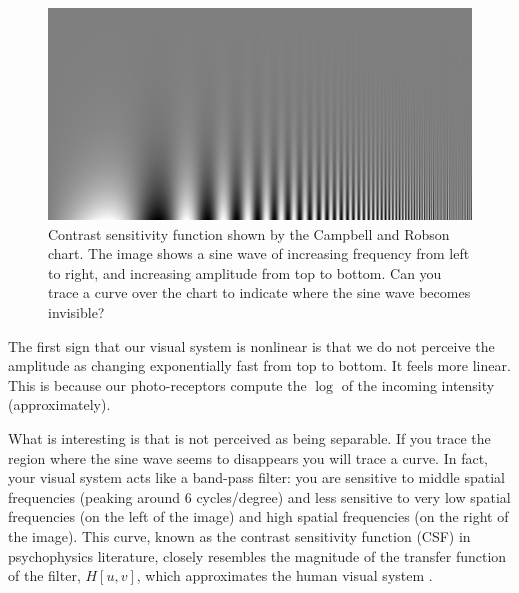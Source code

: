 \begin{figure}[t]
	\centerline{
		\includegraphics[width=1\linewidth]{figures/spatial_filters/csf.jpg}
	}
	\caption{Contrast sensitivity function shown by the Campbell and Robson chart. The image shows a sine wave of increasing frequency from left to right, and increasing amplitude from top to bottom. Can you trace a curve over the chart to indicate where the sine wave becomes invisible?}
	\label{fig:csfchart}
\end{figure}


The first sign that our visual system is nonlinear is that we do not perceive the amplitude as changing exponentially fast from top to bottom. It feels more linear. This is because our photo-receptors compute the $\log$ of the incoming intensity (approximately).

What is interesting is that \fig{\ref{fig:csfchart}} is not perceived as being separable. If you trace the region where the sine wave seems to disappears you will trace a curve.
In fact, your visual system acts like a band-pass filter: you are sensitive to middle spatial frequencies (peaking around 6 cycles/degree) and less sensitive to very low spatial frequencies (on the left of the image) and high spatial frequencies (on the right of the image).
This curve, known as the contrast sensitivity function (CSF)
in psychophysics literature, closely resembles the magnitude of the transfer function of the filter, $H \left[ u,v \right]$, which approximates the human visual system \cite{de1988spatial}.


